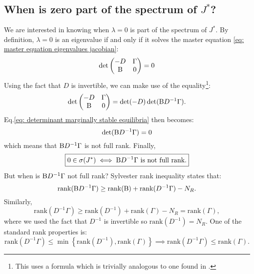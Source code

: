 \documentclass[12pt, titlepage, twoside, openright]{report}
\begin{document}
\subsection{When is zero part of the spectrum of \texorpdfstring{$J^*$}{jstar}?}\label{sec : zero part of spectrum}
We are interested in knowing when $\lambda=0$ is part of the spectrum of $J^*$. By definition, $\lambda=0$ is an eigenvalue if and only if it solves the master equation \eqref{eq: master equation eigenvalues jacobian}:
\begin{equation}
\det
\begin{pmatrix}
  -D   & \Gamma \\
  \text{B} & 0
\end{pmatrix} = 0 \label{eq: determinant marginally stable equilibria}
\end{equation}
Using the fact that $D$ is invertible, we can make use of the equality\footnote{This uses a formula which is trivially analogous to one found in \cite{powell_calculating_2011}.}:
\begin{equation}
\det\begin{pmatrix}
  -D   & \Gamma \\
  \text{B} & 0
\end{pmatrix} = \det(-D)\det(\text{B} D^{-1}\Gamma).
\end{equation}
Eq.\eqref{eq: determinant marginally stable equilibria} then becomes:
\begin{equation}
\det(\text{B} D^{-1}\Gamma)=0
\end{equation}
which means that $\text{B} D^{-1}\Gamma$ is not full rank. Finally,
\begin{equation}
\boxed{
0 \in \sigma(J^*) \iff \text{B} D^{-1}\Gamma \text{ is not full rank.}\label{eq : condition zero in spectrum of J}
}
\end{equation}
But when is $\text{B} D^{-1}\Gamma$ not full rank? Sylvester rank inequality \cite{thome_inequalities_2016} states that:
\begin{equation}
\text{rank}(\text{B} D^{-1}\Gamma) \geq \text{rank}(\text{B})+\text{rank}(D^{-1}\Gamma)
-N_R.
\end{equation}
Similarly,
\begin{equation}
\text{rank}(D^{-1}\Gamma) \geq \text{rank}(D^{-1})+\text{rank}(\Gamma)-N_R=\text{rank}(\Gamma),
\end{equation}
where we used the fact that $D^{-1}$ is invertible so $\text{rank}(D^{-1})=N_R$.
One of the standard rank properties is:
\begin{equation}
\text{rank}(D^{-1}\Gamma) \leq \min\left\{\text{rank}(D^{-1}), \text{rank}(\Gamma)\right\} \implies \text{rank}(D^{-1}\Gamma) \leq \text{rank}(\Gamma).
\end{equation}
\end{document}
